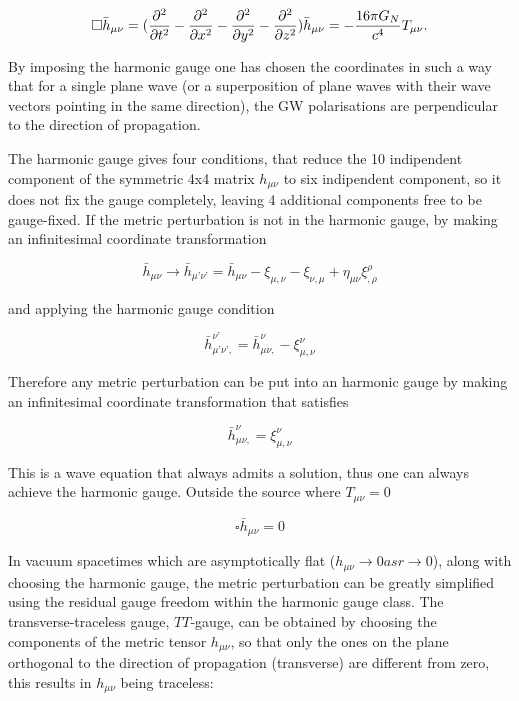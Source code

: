 \documentclass[binding=0.6cm, LaM]{sapthesis}
\begin{document}
		\begin{equation}
		\square {\bar h}_{\mu\nu} =({\partial^2 \over {\partial t^2} } - {\partial^2 \over {\partial x^2}}  - {\partial^2 \over {\partial y^2}}  -  {\partial^2 \over {\partial z^2}}) {\bar h}_{\mu\nu} = -{{16\pi G_{N}} \over {c^4}}T_{\mu\nu}. 
		\end{equation}

	By imposing the harmonic gauge one has chosen the coordinates in such a way that for a single plane wave 
	(or a superposition of plane waves with their wave vectors pointing in the same direction),
	the GW polarisations are perpendicular to the direction of propagation.

	The harmonic gauge gives four conditions, that reduce the 10 indipendent component of the symmetric 4x4 matrix 
	$h_{\mu\nu}$ to six indipendent component, so it does not fix the gauge completely,
	leaving 4 additional components free to be gauge-fixed.
	If the metric perturbation is not in the harmonic gauge, by making an infinitesimal coordinate transformation

		\begin{equation}
		{\bar h}_{\mu\nu} \rightarrow {\bar h}_{\mu’\nu’}  = {\bar h}_{\mu\nu}  - \xi_{\mu,\nu} -\xi_{\nu,\mu} + \eta_{\mu\nu}\xi^{\rho}_{,\rho}
		\end{equation}

	and applying the harmonic gauge condition

		\begin{equation}
		{\bar h}_{\mu’\nu’,} ^{\nu’} = {\bar h}_{\mu\nu,} ^{\nu} - \xi_{\mu,\nu}^{\nu}
		\end{equation}

	Therefore any metric perturbation can be put into an harmonic gauge by making an infinitesimal 
	coordinate transformation that satisfies

		\begin{equation}
		{\bar h}_{\mu\nu,} ^{\nu} = \xi_{\mu,\nu}^{\nu}
		\end{equation}

	This is a wave equation that always admits a solution, thus one can always achieve the harmonic gauge.
	Outside the source where $T_{\mu\nu} = 0$

		\begin{equation}
		\square {\bar h}_{\mu\nu} = 0
		\end{equation}

	In vacuum spacetimes which are asymptotically flat ($h_{\mu\nu} \rightarrow 0 as r \rightarrow 0$), 
	along with choosing the harmonic gauge, the metric perturbation can be greatly simplified using
	the residual gauge freedom within the harmonic gauge class. The transverse-traceless gauge,  
	$TT$-gauge, can be obtained by choosing the components of the metric tensor $h_{\mu\nu}$,
	so that only the ones on the plane orthogonal to the direction of propagation (transverse) 
	are different from zero, this results in $h_{\mu\nu}$ being traceless:
\end{document}
